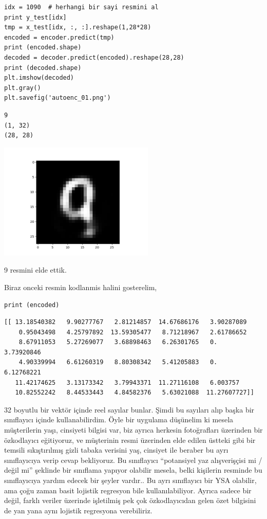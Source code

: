 \documentclass[12pt,fleqn]{article}\usepackage{../../common}
\begin{document}
\begin{verbatim}
idx = 1090  # herhangi bir sayi resmini al
print y_test[idx]
tmp = x_test[idx, :, :].reshape(1,28*28)
encoded = encoder.predict(tmp)
print (encoded.shape)
decoded = decoder.predict(encoded).reshape(28,28)
print (decoded.shape)
plt.imshow(decoded)
plt.gray()
plt.savefig('autoenc_01.png')
\end{verbatim}

\begin{verbatim}
9
(1, 32)
(28, 28)
\end{verbatim}

\includegraphics[width=20em]{autoenc_01.png}

9 resmini elde ettik. 

Biraz onceki resmin kodlanmis halini gosterelim,

\begin{verbatim}
print (encoded)
\end{verbatim}

\begin{verbatim}
[[ 13.18540382   9.90277767   2.81214857  14.67686176   3.90287089
    0.95043498   4.25797892  13.59305477   8.71218967   2.61786652
    8.67911053   5.27269077   3.68898463   6.26301765   0.           3.73920846
    4.90339994   6.61260319   8.80308342   5.41205883   0.           6.12768221
   11.42174625   3.13173342   3.79943371  11.27116108   6.003757
   10.82552242   8.44533443   4.84582376   5.63021088  11.27607727]]
\end{verbatim}

32 boyutlu bir vektör içinde reel sayılar bunlar. Şimdi bu sayıları alıp
başka bir sınıflayıcı içinde kullanabilirdim. Öyle bir uygulama düşünelim
ki mesela müşterilerin yaşı, cinsiyeti bilgisi var, biz ayrıca herkesin
fotoğrafları üzerinden bir özkodlayıcı eğitiyoruz, ve müşterinin resmi
üzerinden elde edilen üstteki gibi bir temsili sıkıştırılmış gizli tabaka
verisini yaş, cinsiyet ile beraber bu ayrı sınıflayıcıya verip cevap
bekliyoruz. Bu sınıflayıcı ``potansiyel yaz alışverişçisi mi / değil mi''
şeklinde bir sınıflama yapıyor olabilir mesela, belki kişilerin resminde bu
sınıflayıcıya yardım edecek bir şeyler vardır.. Bu ayrı sınıflayıcı bir YSA
olabilir, ama çoğu zaman basit lojistik regresyon bile kullanılabiliyor.
Ayrıca sadece bir değil, farklı veriler üzerinde işletilmiş pek çok
özkodlayıcıdan gelen özet bilgisini de yan yana aynı lojistik regresyona
verebiliriz.
\end{document}
